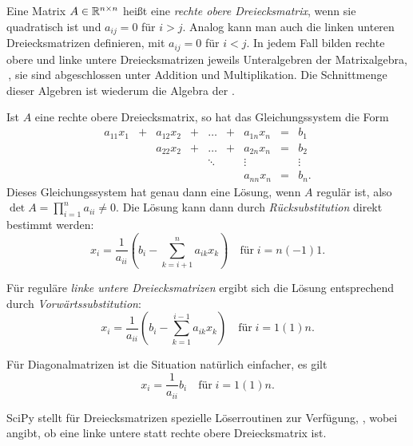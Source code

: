 \section{}

Eine Matrix $A\in\mathbb{R}^{n\times n}$ heißt eine \emph{rechte obere
  Dreiecksmatrix}, wenn sie quadratisch ist und $a_{ij}=0$ für $i>j$.
Analog kann man auch die linken unteren Dreiecksmatrizen definieren,
mit $a_{ij}=0$ für $i<j$. In jedem Fall bilden rechte obere und linke
untere Dreiecksmatrizen jeweils Unteralgebren der Matrixalgebra, \dh\,,
sie sind abgeschlossen unter Addition und Multiplikation. Die
Schnittmenge dieser Algebren ist wiederum die Algebra der
\emph{}.

Ist $A$ eine rechte obere Dreiecksmatrix, so hat das Gleichungssystem
die Form
\begin{equation}
  \begin{matrix}
    a_{11}x_1 &+&  a_{12}x_2 &+& \ldots &+& a_{1n}x_n &=& b_1\\
             &&  a_{22}x_2 &+& \ldots &+& a_{2n}x_n &=& b_2\\
             &&            && \ddots && \vdots  && \vdots\\
             &&            &&        && a_{nn}x_n &=& b_n.
  \end{matrix}
\end{equation}
Dieses Gleichungssystem hat genau dann eine Lösung, wenn $A$ regulär
ist, also $\det A=\prod_{i=1}^na_{ii}\neq 0$. Die Lösung kann dann durch
\emph{Rücksubstitution} direkt bestimmt werden:
\begin{equation}
  \label{eq:ruecksubst}
  x_i = \frac{1}{a_{ii}}\left( b_i - \sum_{k=i+1}^n a_{ik}x_k\right)
  \quad\text{für}\; i=n(-1)1.
\end{equation}

Für reguläre \emph{linke untere Dreiecksmatrizen} ergibt sich die
Lösung entsprechend durch \emph{Vorwärtssubstitution}:
\begin{equation}
  \label{eq:vorwsubst}
  x_i = \frac{1}{a_{ii}}\left( b_i - \sum_{k=1}^{i-1} a_{ik}x_k\right)
  \quad\text{für}\; i=1(1)n.
\end{equation}

Für Diagonalmatrizen ist die Situation natürlich einfacher, es gilt
\begin{equation}
  x_i = \frac{1}{a_{ii}} b_i
  \quad\text{für}\; i=1(1)n.
\end{equation}

\begin{sloppypar}
  SciPy stellt für Dreiecksmatrizen spezielle Löserroutinen zur
  Verfügung, ,
  wobei  angibt, ob   eine linke untere statt rechte
  obere Dreiecksmatrix ist.
\end{sloppypar}

